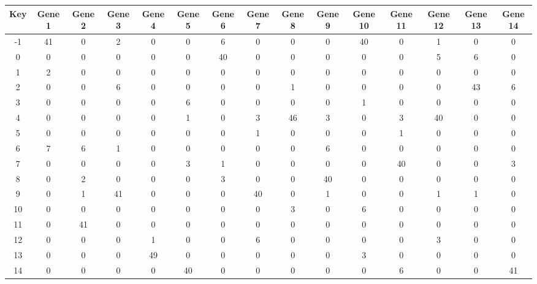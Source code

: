 \begin{tabular}{|c|c|c|c|c|c|c|c|c|c|c|c|c|c|c|}
\hline
Key & Gene 1 & Gene 2 & Gene 3 & Gene 4 & Gene 5 & Gene 6 & Gene 7 & Gene 8 & Gene 9 & Gene 10 & Gene 11 & Gene 12 & Gene 13 & Gene 14 \\
\hline
-1 & 41 & 0 & 2 & 0 & 0 & 6 & 0 & 0 & 0 & 40 & 0 & 1 & 0 & 0 \\
0 & 0 & 0 & 0 & 0 & 0 & 40 & 0 & 0 & 0 & 0 & 0 & 5 & 6 & 0 \\
1 & 2 & 0 & 0 & 0 & 0 & 0 & 0 & 0 & 0 & 0 & 0 & 0 & 0 & 0 \\
2 & 0 & 0 & 6 & 0 & 0 & 0 & 0 & 1 & 0 & 0 & 0 & 0 & 43 & 6 \\
3 & 0 & 0 & 0 & 0 & 6 & 0 & 0 & 0 & 0 & 1 & 0 & 0 & 0 & 0 \\
4 & 0 & 0 & 0 & 0 & 1 & 0 & 3 & 46 & 3 & 0 & 3 & 40 & 0 & 0 \\
5 & 0 & 0 & 0 & 0 & 0 & 0 & 1 & 0 & 0 & 0 & 1 & 0 & 0 & 0 \\
6 & 7 & 6 & 1 & 0 & 0 & 0 & 0 & 0 & 6 & 0 & 0 & 0 & 0 & 0 \\
7 & 0 & 0 & 0 & 0 & 3 & 1 & 0 & 0 & 0 & 0 & 40 & 0 & 0 & 3 \\
8 & 0 & 2 & 0 & 0 & 0 & 3 & 0 & 0 & 40 & 0 & 0 & 0 & 0 & 0 \\
9 & 0 & 1 & 41 & 0 & 0 & 0 & 40 & 0 & 1 & 0 & 0 & 1 & 1 & 0 \\
10 & 0 & 0 & 0 & 0 & 0 & 0 & 0 & 3 & 0 & 6 & 0 & 0 & 0 & 0 \\
11 & 0 & 41 & 0 & 0 & 0 & 0 & 0 & 0 & 0 & 0 & 0 & 0 & 0 & 0 \\
12 & 0 & 0 & 0 & 1 & 0 & 0 & 6 & 0 & 0 & 0 & 0 & 3 & 0 & 0 \\
13 & 0 & 0 & 0 & 49 & 0 & 0 & 0 & 0 & 0 & 3 & 0 & 0 & 0 & 0 \\
14 & 0 & 0 & 0 & 0 & 40 & 0 & 0 & 0 & 0 & 0 & 6 & 0 & 0 & 41 \\
\hline
\end{tabular}